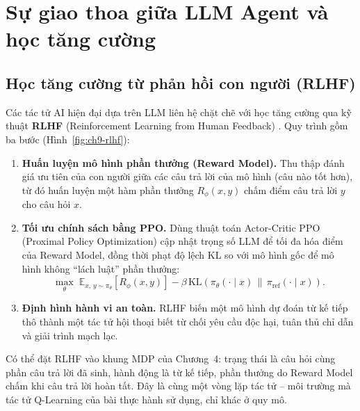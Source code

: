 \chapter{Sự giao thoa giữa LLM Agent và học tăng cường}\label{ch:giaothoa}

\section{Học tăng cường từ phản hồi con người (RLHF)}
Các tác tử AI hiện đại dựa trên LLM liên hệ chặt chẽ với học tăng cường qua kỹ thuật \textbf{RLHF} (Reinforcement Learning
from Human Feedback) \cite{christiano_rlhf}. Quy trình gồm ba bước (Hình~\ref{fig:ch9-rlhf}):
\begin{enumerate}
  \item \textbf{Huấn luyện mô hình phần thưởng (Reward Model).} Thu thập đánh giá ưu tiên của con người giữa các câu trả
        lời của mô hình (câu nào tốt hơn), từ đó huấn luyện một hàm phần thưởng $R_\phi(x, y)$ chấm điểm câu trả lời $y$
        cho câu hỏi $x$.
  \item \textbf{Tối ưu chính sách bằng PPO.} Dùng thuật toán Actor-Critic PPO (Proximal Policy Optimization) cập nhật
        trọng số LLM để tối đa hóa điểm của Reward Model, đồng thời phạt độ lệch KL so với mô hình gốc để mô hình không
        ``lách luật'' phần thưởng:
        \[
          \max_\theta\; \mathbb{E}_{x,\, y \sim \pi_\theta}\!\left[ R_\phi(x,y) \right]
          - \beta\, \mathrm{KL}\!\left( \pi_\theta(\cdot \mid x) \,\|\, \pi_{\text{ref}}(\cdot \mid x) \right).
        \]
  \item \textbf{Định hình hành vi an toàn.} RLHF biến một mô hình dự đoán từ kế tiếp thô thành một tác tử hội thoại biết
        từ chối yêu cầu độc hại, tuân thủ chỉ dẫn và giải trình mạch lạc.
\end{enumerate}
Có thể đặt RLHF vào khung MDP của Chương~4: trạng thái là câu hỏi cùng phần câu trả lời đã sinh, hành động là từ kế tiếp,
phần thưởng do Reward Model chấm khi câu trả lời hoàn tất. Đây là cùng một vòng lặp tác tử -- môi trường mà tác tử
Q-Learning của bài thực hành sử dụng, chỉ khác ở quy mô.


